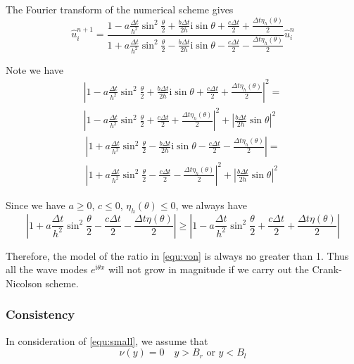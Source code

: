 \documentclass[3p,,preprint,12pt]{elsarticle}
\newcommand{\ii}[0]{\mathrm{i}}
\theoremstyle{definition}
\begin{document}
The Fourier transform of the numerical scheme gives
\begin{equation}\label{equ:von}
	\hat u_i^{n+1} = \frac{{1 - a\frac{{\Delta t}}{{{h^2}}}{{\sin }^2}\frac{\theta }{2} + \frac{{b\Delta t}}{{2h}}\ii\sin \theta  + \frac{{c\Delta t}}{2}+ \frac{{\Delta t\eta_h (\theta )}}{2}}}{{1 + a\frac{{\Delta t}}{{{h^2}}}{{\sin }^2}\frac{\theta }{2} - \frac{{b\Delta t}}{{2h}}\ii\sin \theta  - \frac{{c\Delta t}}{2} - \frac{{\Delta t\eta_h (\theta )}}{2}}} \hat u_i^n
\end{equation}

Note we have
\begin{multline}
{\left| {1 - a\frac{{\Delta t}}{{{h^2}}}{{\sin }^2}\frac{\theta }{2} + \frac{{b\Delta t}}{{2h}}\ii\sin \theta  + \frac{{c\Delta t}}{2} + \frac{{\Delta t\eta_h (\theta )}}{2}} \right|^2} = \\
{\left| {1 - a\frac{{\Delta t}}{{{h^2}}}{{\sin }^2}\frac{\theta }{2} + \frac{{c\Delta t}}{2} + \frac{{\Delta t\eta_h (\theta )}}{2}} \right|^2} + {\left| {\frac{{b\Delta t}}{{2h}}\sin \theta } \right|^2}
\end{multline}
\begin{multline}
\left| {1 + a\frac{{\Delta t}}{{{h^2}}}{{\sin }^2}\frac{\theta }{2} - \frac{{b\Delta t}}{{2h}}\ii\sin \theta  - \frac{{c\Delta t}}{2} - \frac{{\Delta t\eta_h (\theta )}}{2}} \right| = \\
{\left| {1 + a\frac{{\Delta t}}{{{h^2}}}{{\sin }^2}\frac{\theta }{2} - \frac{{c\Delta t}}{2} - \frac{{\Delta t\eta_h (\theta )}}{2}} \right|^2} + {\left| {\frac{{b\Delta t}}{{2h}}\sin \theta } \right|^2}
\end{multline}

Since we have $a\geq 0$, $c\leq 0$, $\eta_h(\theta)\leq  0$, we always have
\begin{equation}
	\left| {1 + a\frac{{\Delta t}}{{{h^2}}}{{\sin }^2}\frac{\theta }{2} - \frac{{c\Delta t}}{2} - \frac{{\Delta t\eta (\theta )}}{2}} \right| \ge \left| {1 - a\frac{{\Delta t}}{{{h^2}}}{{\sin }^2}\frac{\theta }{2} + \frac{{c\Delta t}}{2} + \frac{{\Delta t\eta (\theta )}}{2}} \right|
\end{equation}

Therefore, the model of the ratio in \cref{equ:von} is always no greater than 1. Thus all the wave modes $e^{\ii \theta x}$ will not grow in magnitude if we carry out the Crank-Nicolson scheme. 

\subsubsection{Consistency}
In consideration of \cref{equ:small}, we assume that 
\begin{equation}\label{equ:assumption}
	\nu(y) = 0 \quad y>B_r \mbox{ or } y<B_l
\end{equation}
\end{document}
